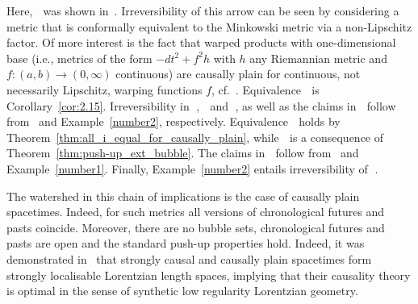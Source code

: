 \documentclass[reqno]{amsart}
\numberwithin{equation}{section}
\theoremstyle{plain}
\theoremstyle{definition}
\theoremstyle{remark}
\begin{document}
Here, \textcircled{} was shown in~\cite[Cor.\ 1.17]{CG:12}. Irreversibility of this 
arrow can be seen by considering a metric that is conformally equivalent to the Minkowski metric via a non-Lipschitz factor. 
Of more interest is the fact that warped products with one-dimensional base (i.e., metrics of the form $-dt^2+f^2 h$ with $h$ any Riemannian metric and $f:(a,b) \to (0,\infty)$ continuous) are causally 
plain for continuous, not necessarily Lipschitz, warping functions $f$, cf.\ \cite{AGKS:19}.
Equivalence \textcircled{} is Corollary~\ref{cor:2.15}. Irreversibility in
\textcircled{}, \textcircled{} 
and \textcircled{}, as well as the claims in \textcircled{} follow from~\cite[Ex.\ 1.12]{CG:12} and Example~\ref{number2}, respectively. Equivalence \textcircled{} 
holds by Theorem~\ref{thm:all_i_equal_for_causally_plain}, while \textcircled{} is a consequence of 
Theorem~\ref{thm:push-up_ext_bubble}.
The claims in \textcircled{} follow from~\cite[Ex.\ 1.12]{CG:12}
and Example~\ref{number1}. Finally, Example~\ref{number2} entails irreversibility of \textcircled{}.

The watershed in this chain of implications is the case of causally plain spacetimes. Indeed, for such metrics all
versions of chronological futures and pasts coincide. 
Moreover, there are no bubble sets, chronological futures and pasts are open and the standard push-up
properties hold. Indeed, it was demonstrated in~\cite[Sec.\ 5.1]{KS:18} that strongly causal and 
causally plain spacetimes form strongly localisable Lorentzian length spaces, implying that their
causality theory is optimal in the sense of synthetic low regularity Lorentzian geometry.
\end{document}
